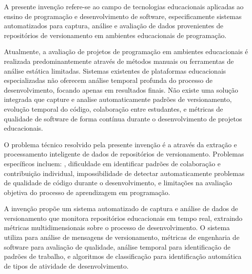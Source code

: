 \documentclass{patente}
\begin{document}

A presente invenção refere-se ao campo de tecnologias educacionais aplicadas ao ensino de programação e desenvolvimento de software, especificamente sistemas automatizados para captura, análise e avaliação de dados provenientes de repositórios de versionamento em ambientes educacionais de programação.

Atualmente, a avaliação de projetos de programação em ambientes educacionais é realizada predominantemente através de métodos manuais ou ferramentas de análise estática limitadas. Sistemas existentes de plataformas educacionais especializadas não oferecem análise temporal profunda do processo de desenvolvimento, focando apenas em resultados finais. Não existe uma solução integrada que capture e analise automaticamente padrões de versionamento, evolução temporal do código, colaboração entre estudantes, e métricas de qualidade de software de forma contínua durante o desenvolvimento de projetos educacionais.

O problema técnico resolvido pela presente invenção é a  através da extração e processamento inteligente de dados de repositórios de versionamento. Problemas específicos incluem: , dificuldade em identificar padrões de colaboração e contribuição individual, impossibilidade de detectar automaticamente problemas de qualidade de código durante o desenvolvimento, e limitações na avaliação objetiva do processo de aprendizagem em programação.

A invenção propõe um sistema automatizado de captura e análise de dados de versionamento que monitora repositórios educacionais em tempo real, extraindo métricas multidimensionais sobre o processo de desenvolvimento. O sistema utiliza  para análise de mensagens de versionamento, métricas de engenharia de software para avaliação de qualidade, análise temporal para identificação de padrões de trabalho, e algoritmos de classificação para identificação automática de tipos de atividade de desenvolvimento.
\end{document}
